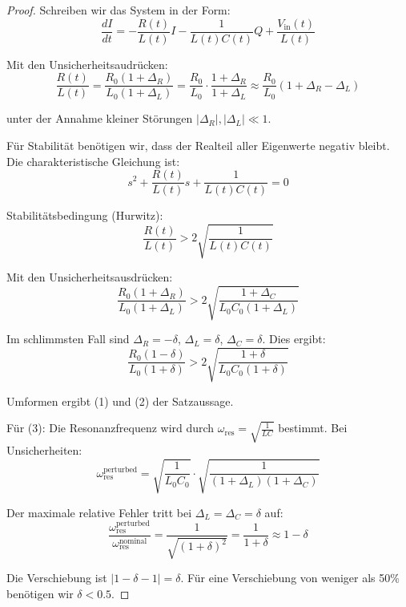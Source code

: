 \documentclass[a4paper,12pt,twoside]{report}
\theoremstyle{definition}
\begin{document}
\begin{proof}

Schreiben wir das System in der Form:
\begin{equation}
\frac{dI}{dt} = -\frac{R(t)}{L(t)} I - \frac{1}{L(t)C(t)} Q + \frac{V_{\text{in}}(t)}{L(t)}
\end{equation}

Mit den Unsicherheitsaudrücken:
\begin{equation}
\frac{R(t)}{L(t)} = \frac{R_0(1+\Delta_R)}{L_0(1+\Delta_L)} = \frac{R_0}{L_0} \cdot \frac{1+\Delta_R}{1+\Delta_L} \approx \frac{R_0}{L_0} (1 + \Delta_R - \Delta_L)
\end{equation}

unter der Annahme kleiner Störungen $|\Delta_R|, |\Delta_L| \ll 1$.

Für Stabilität benötigen wir, dass der Realteil aller Eigenwerte negativ bleibt. Die charakteristische Gleichung ist:
\begin{equation}
s^2 + \frac{R(t)}{L(t)} s + \frac{1}{L(t)C(t)} = 0
\end{equation}

Stabilitätsbedingung (Hurwitz): 
\begin{equation}
\frac{R(t)}{L(t)} > 2\sqrt{\frac{1}{L(t)C(t)}}
\end{equation}

Mit den Unsicherheitsausdrücken:
\begin{equation}
\frac{R_0(1+\Delta_R)}{L_0(1+\Delta_L)} > 2\sqrt{\frac{1+\Delta_C}{L_0 C_0(1+\Delta_L)}}
\end{equation}

Im schlimmsten Fall sind $\Delta_R = -\delta$, $\Delta_L = \delta$, $\Delta_C = \delta$. Dies ergibt:
\begin{equation}
\frac{R_0(1-\delta)}{L_0(1+\delta)} > 2\sqrt{\frac{1+\delta}{L_0 C_0(1+\delta)}}
\end{equation}

Umformen ergibt (1) und (2) der Satzaussage.

Für (3): Die Resonanzfrequenz wird durch $\omega_{\text{res}} = \sqrt{\frac{1}{LC}}$ bestimmt. Bei Unsicherheiten:
\begin{equation}
\omega_{\text{res}}^{\text{perturbed}} = \sqrt{\frac{1}{L_0 C_0}} \cdot \sqrt{\frac{1}{(1+\Delta_L)(1+\Delta_C)}}
\end{equation}

Der maximale relative Fehler tritt bei $\Delta_L = \Delta_C = \delta$ auf:
\begin{equation}
\frac{\omega_{\text{res}}^{\text{perturbed}}}{\omega_{\text{res}}^{\text{nominal}}} = \frac{1}{\sqrt{(1+\delta)^2}} = \frac{1}{1+\delta} \approx 1 - \delta
\end{equation}

Die Verschiebung ist $|1-\delta - 1| = \delta$. Für eine Verschiebung von weniger als 50\% benötigen wir $\delta < 0.5$.

\end{proof}
\end{document}
